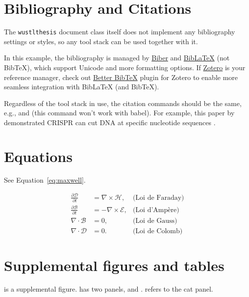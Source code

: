 \section{Bibliography and Citations}
The \texttt{wustlthesis} document class itself does not implement any bibliography settings or styles, so any tool stack can be used together with it.

In this example, the bibliography is managed by \href{http://biblatex-biber.sourceforge.net/}{Biber} and \href{https://www.ctan.org/pkg/biblatex}{BibLaTeX} (not BibTeX), which support Unicode and more formatting options.
If \href{https://www.zotero.org/}{Zotero} is your reference manager, check out \href{https://retorque.re/zotero-better-bibtex/}{Better BibTeX} plugin for Zotero to enable more seamless integration with BibLaTeX (and BibTeX).

Regardless of the tool stack in use, the citation commands should be the same, e.g., \cmd{\cite} and \cmd{\citeauthor} (this command won't work with babel).
For example, this paper by \cite{Jinek2012} demonstrated CRISPR can cut DNA at specific nucleotide sequences \cite{Jinek2012}.


\section{Equations}
See Equation~\ref{eq:maxwell}.

\begin{equation}
    \label{eq:maxwell}
    \begin{aligned}
    \frac{\partial\mathcal{D}}{\partial t} & = \nabla\times\mathcal{H},   & \text{(Loi de Faraday)}\\
    \frac{\partial\mathcal{B}}{\partial t} & = -\nabla\times\mathcal{E},  & \text{(Loi d'Ampère)}\\
    \nabla\cdot\mathcal{B}                 & = 0,                         & \text{(Loi de Gauss)}\\
    \nabla\cdot\mathcal{D}                 & = 0.                         & \text{(Loi de Colomb)}
    \end{aligned}
\end{equation}


\section{Supplemental figures and tables}
 is a supplemental figure.
 has two panels,  and .
 refers to the cat panel.

